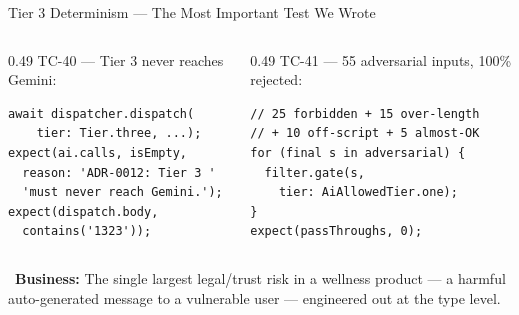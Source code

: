 \documentclass[aspectratio=169,11pt]{beamer}
\providecommand{\faChartPie}{}
\newcommand{\biz}[1]{\vspace{0.3em}\par{\footnotesize\color{moodorange}\faChartPie\ \textbf{Business:} #1}}
\begin{document}
\begin{frame}[fragile]{Tier 3 Determinism --- The Most Important Test We Wrote}
\begin{columns}[T,onlytextwidth]
  \begin{column}{0.49\textwidth}
{\footnotesize TC-40 --- Tier 3 never reaches Gemini:}
\begin{lstlisting}[style=dartstyle]
await dispatcher.dispatch(
    tier: Tier.three, ...);
expect(ai.calls, isEmpty,
  reason: 'ADR-0012: Tier 3 '
  'must never reach Gemini.');
expect(dispatch.body,
  contains('1323'));
\end{lstlisting}
  \end{column}
  \begin{column}{0.49\textwidth}
{\footnotesize TC-41 --- 55 adversarial inputs, 100\% rejected:}
\begin{lstlisting}[style=dartstyle]
// 25 forbidden + 15 over-length
// + 10 off-script + 5 almost-OK
for (final s in adversarial) {
  filter.gate(s,
    tier: AiAllowedTier.one);
}
expect(passThroughs, 0);
\end{lstlisting}
  \end{column}
\end{columns}
\vspace{0.1em}
\biz{The single largest legal/trust risk in a wellness product --- a harmful auto-generated message to a vulnerable user --- engineered out at the type level.}
\end{frame}
\end{document}

